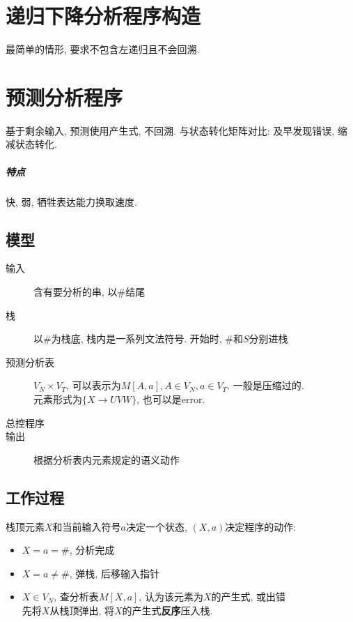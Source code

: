     \section{递归下降分析程序构造}

        最简单的情形, 要求不包含左递归且不会回溯. 

    \section{预测分析程序}

        基于剩余输入, 预测使用产生式, 不回溯. 与状态转化矩阵对比: 及早发现错误, 缩减状态转化.

            \subparagraph{特点} 快, 弱, 牺牲表达能力换取速度.

        \subsection{模型}

            \begin{description}
                \item[输入] 含有要分析的串, 以\#结尾
                \item[栈] 以\#为栈底, 栈内是一系列文法符号. 开始时, \#和$S$分别进栈
                \item[预测分析表] $V_N\times V_T$, 可以表示为$M[A,a], A\in V_N,a\in V_T$. 一般是压缩过的. \\
                    元素形式为$\{X\to UVW\}$, 也可以是error.
                \item[总控程序]
                \item[输出] 根据分析表内元素规定的语义动作
            \end{description}

        \subsection{工作过程}

            栈顶元素$X$和当前输入符号$a$决定一个\textsf{状态}, $(X,a)$决定程序的动作:
            \begin{itemize}
                \item $X=a=\#$, 分析完成
                \item $X=a\not =\#$, 弹栈, 后移输入指针
                \item $X\in V_N$, 查分析表$M[X,a]$, 认为该元素为$X$的产生式, 或出错 \\
                    先将$X$从栈顶弹出, 将$X$的产生式\textbf{反序}压入栈.
            \end{itemize}

